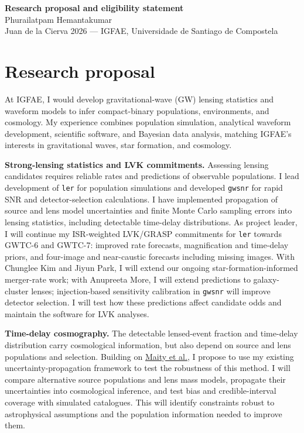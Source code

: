 \documentclass[11pt,a4paper]{article}
\begin{document}
\begin{center}
{\large\bfseries Research proposal and eligibility statement}\\[3pt]
Phurailatpam Hemantakumar\\
Juan de la Cierva 2026 --- IGFAE, Universidade de Santiago de Compostela
\end{center}

\section*{Research proposal}
At IGFAE, I would develop gravitational-wave (GW) lensing statistics and waveform models to infer compact-binary populations, environments, and cosmology. My experience combines population simulation, analytical waveform development, scientific software, and Bayesian data analysis, matching IGFAE's interests in gravitational waves, star formation, and cosmology.

\textbf{Strong-lensing statistics and LVK commitments.}
Assessing lensing candidates requires reliable rates and predictions of observable populations. I lead development of \texttt{ler} for population simulations and developed \texttt{gwsnr} for rapid SNR and detector-selection calculations. I have implemented propagation of source and lens model uncertainties and finite Monte Carlo sampling errors into lensing statistics, including detectable time-delay distributions. As project leader, I will continue my ISR-weighted LVK/GRASP commitments for \texttt{ler} towards GWTC-6 and GWTC-7: improved rate forecasts, magnification and time-delay priors, and four-image and near-caustic forecasts including missing images. With Chunglee Kim and Jiyun Park, I will extend our ongoing star-formation-informed merger-rate work; with Anupreeta More, I will extend predictions to galaxy-cluster lenses; injection-based sensitivity calibration in \texttt{gwsnr} will improve detector selection. I will test how these predictions affect candidate odds and maintain the software for LVK analyses.

\textbf{Time-delay cosmography.}
The detectable lensed-event fraction and time-delay distribution carry cosmological information, but also depend on source and lens populations and selection. Building on \href{https://arxiv.org/abs/2512.15168}{Maity et al.}, I propose to use my existing uncertainty-propagation framework to test the robustness of this method. I will compare alternative source populations and lens mass models, propagate their uncertainties into cosmological inference, and test bias and credible-interval coverage with simulated catalogues. This will identify constraints robust to astrophysical assumptions and the population information needed to improve them.
\end{document}

